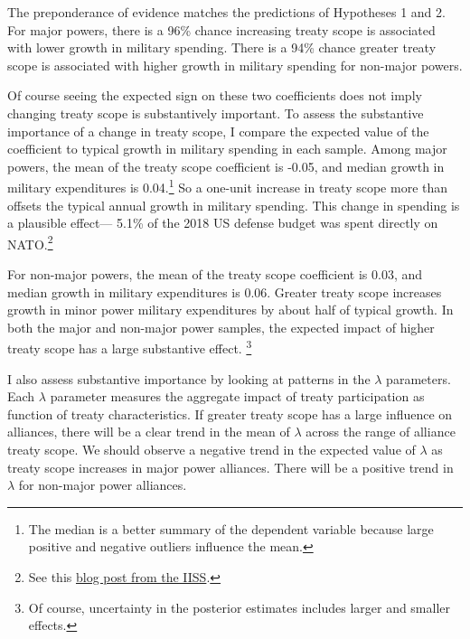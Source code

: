 \documentclass[12pt]{article}
\begin{document}
The preponderance of evidence matches the predictions of Hypotheses 1 and 2. 
For major powers, there is a 96\% chance increasing treaty scope is associated with lower growth in military spending. 
There is a 94\% chance greater treaty scope is associated with higher growth in military spending for non-major powers.


Of course seeing the expected sign on these two coefficients does not imply changing treaty scope is substantively important. 
To assess the substantive importance of a change in treaty scope, I compare the expected value of the coefficient to typical growth in military spending in each sample. 
Among major powers, the mean of the treaty scope coefficient is -0.05, and median growth in military expenditures is 0.04.\footnote{The median is a better summary of the dependent variable because large positive and negative outliers influence the mean.} 
So a one-unit increase in treaty scope more than offsets the typical annual growth in military spending. 
This change in spending is a plausible effect--- 5.1\% of the 2018 US defense budget was spent directly on NATO.\footnote{See this \href{https://www.iiss.org/blogs/military-balance/2018/07/us-and-nato-allies-costs-and-value}{blog post from the IISS}.} 


For non-major powers, the mean of the treaty scope coefficient is 0.03, and median growth in military expenditures is 0.06. 
Greater treaty scope increases growth in minor power military expenditures by about half of typical growth. 
In both the major and non-major power samples, the expected impact of higher treaty scope has a large substantive effect. \footnote{Of course, uncertainty in the posterior estimates includes larger and smaller effects.}


I also assess substantive importance by looking at patterns in the $\lambda$ parameters. 
Each $\lambda$ parameter measures the aggregate impact of treaty participation as function of treaty characteristics. 
If greater treaty scope has a large influence on alliances, there will be a clear trend in the mean of $\lambda$ across the range of alliance treaty scope.
We should observe a negative trend in the expected value of $\lambda$ as treaty scope increases in major power alliances. 
There will be a positive trend in $\lambda$ for non-major power alliances. 
\end{document}
